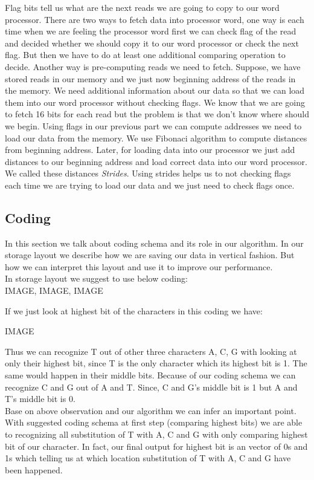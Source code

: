 Flag bits tell us what are the next reads we are going to copy to our word processor. There are two ways to fetch data into processor word, one way is each time when we are feeling the processor word first we can check flag of the read and decided whether we should copy it to our word processor or check the next flag. But then we have to do at least one additional comparing operation to decide. Another way is pre-computing reads we need to fetch. Suppose, we have stored reads in our memory and we just now beginning address of the reads in the memory. We need additional information about our data so that we can load them into our word processor without checking flags. We know that we are going to fetch 16 bits for each read but the problem is that we don't know where should we begin. Using flags in our previous part we can compute addresses we need to load our data from the memory. We use Fibonaci algorithm to compute distances from beginning address. Later, for loading data into our processor we just add distances to our beginning address and load correct data into our word processor. We called these distances \emph{Strides}. Using strides helps us to not checking flags each time we are trying to load our data and we just need to check flags once.

\subsection{Coding}
In this section we talk about coding schema and its role in our algorithm. In our storage layout we describe how we are saving our data in vertical fashion. But how we can interpret this layout and use it to improve our performance.\\
In storage layout we suggest to use below coding:\\
 IMAGE, IMAGE, IMAGE
 
If we just look at highest bit of the characters in this coding we have:

IMAGE

Thus we can recognize T out of other three characters A, C, G with looking at only their highest bit, since T is the only character which its highest bit is 1. The same would happen in their middle bits. Because of our coding schema we can recognize C and G out of A and T. Since, C and G's middle bit is 1 but A and T's middle bit is 0.\\
Base on above observation and our algorithm we can infer an important point. With suggested coding schema at first step (comparing highest bits) we are able to recognizing all substitution of T with A, C and G with only comparing highest bit of our character. In fact, our final output for highest bit is an vector of 0s and 1s which telling us at which location substitution of T with A, C and G have been happened.
  